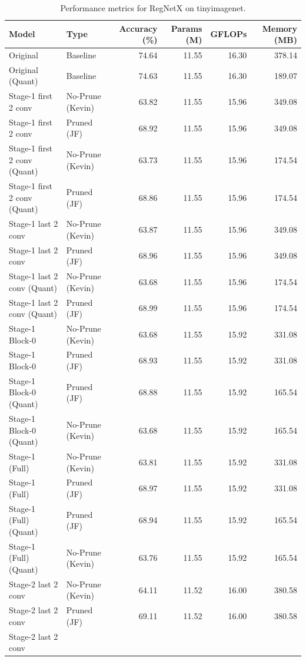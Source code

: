 \begin{table}
\caption{Performance metrics for RegNetX on tinyimagenet.}
\label{tab:RegNetX_tinyimagenet}
\begin{tabular}{llrrrr}
\toprule
Model & Type & Accuracy (\%) & Params (M) & GFLOPs & Memory (MB) \\
\midrule
Original & Baseline & 74.64 & 11.55 & 16.30 & 378.14 \\
Original
(Quant) & Baseline & 74.63 & 11.55 & 16.30 & 189.07 \\
Stage-1 first 2 conv & No-Prune (Kevin) & 63.82 & 11.55 & 15.96 & 349.08 \\
Stage-1 first 2 conv & Pruned (JF) & 68.92 & 11.55 & 15.96 & 349.08 \\
Stage-1 first 2 conv
(Quant) & No-Prune (Kevin) & 63.73 & 11.55 & 15.96 & 174.54 \\
Stage-1 first 2 conv
(Quant) & Pruned (JF) & 68.86 & 11.55 & 15.96 & 174.54 \\
Stage-1 last 2 conv & No-Prune (Kevin) & 63.87 & 11.55 & 15.96 & 349.08 \\
Stage-1 last 2 conv & Pruned (JF) & 68.96 & 11.55 & 15.96 & 349.08 \\
Stage-1 last 2 conv
(Quant) & No-Prune (Kevin) & 63.68 & 11.55 & 15.96 & 174.54 \\
Stage-1 last 2 conv
(Quant) & Pruned (JF) & 68.99 & 11.55 & 15.96 & 174.54 \\
Stage-1 Block-0 & No-Prune (Kevin) & 63.68 & 11.55 & 15.92 & 331.08 \\
Stage-1 Block-0 & Pruned (JF) & 68.93 & 11.55 & 15.92 & 331.08 \\
Stage-1 Block-0
(Quant) & Pruned (JF) & 68.88 & 11.55 & 15.92 & 165.54 \\
Stage-1 Block-0
(Quant) & No-Prune (Kevin) & 63.68 & 11.55 & 15.92 & 165.54 \\
Stage-1 (Full) & No-Prune (Kevin) & 63.81 & 11.55 & 15.92 & 331.08 \\
Stage-1 (Full) & Pruned (JF) & 68.97 & 11.55 & 15.92 & 331.08 \\
Stage-1 (Full)
(Quant) & Pruned (JF) & 68.94 & 11.55 & 15.92 & 165.54 \\
Stage-1 (Full)
(Quant) & No-Prune (Kevin) & 63.76 & 11.55 & 15.92 & 165.54 \\
Stage-2 last 2 conv & No-Prune (Kevin) & 64.11 & 11.52 & 16.00 & 380.58 \\
Stage-2 last 2 conv & Pruned (JF) & 69.11 & 11.52 & 16.00 & 380.58 \\
Stage-2 last 2 conv

\end{tabular}
\end{table}
